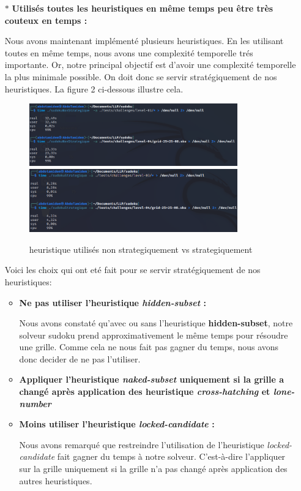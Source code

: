 \documentclass{article}
\begin{document}
\begin{enumerate}
\item[$\ast$] \textbf{Utilisés toutes les heuristiques en même temps peu être très couteux en temps : } \vspace{0.15cm}

Nous avons maintenant implémenté plusieurs heuristiques. En les utilisant toutes en même temps, nous avons une complexité temporelle trés importante. Or, notre principal objectif est d'avoir une complexité temporelle la plus minimale possible. On doit donc se servir stratégiquement de nos heuristiques. La figure 2 ci-dessous illustre cela. 

\begin{figure}[H]
\includegraphics[width=9cm,left]{sansStrategie.png}
\includegraphics[width=9cm,right]{strategique.png}
    \caption{heuristique utilisés non strategiquement vs strategiquement}
\end{figure}

Voici les choix qui ont eté fait pour se servir stratégiquement de nos heuristiques:\vspace{0.2cm}

\begin{itemize}
    \item \textbf{Ne pas utiliser l'heuristique \textit{hidden-subset} :}
    
    Nous avons constaté qu'avec ou sans l'heuristique \textbf{hidden-subset}, notre solveur sudoku prend approximativement le même temps pour résoudre une grille. Comme cela ne nous fait pas gagner du temps, nous avons donc decider de ne pas l'utiliser.\vspace{0.2cm}

    \item \textbf{Appliquer l'heuristique  \textit{naked-subset} uniquement si la grille a changé après application des heuristique \textit{cross-hatching} et \textit{lone-number} }\vspace{0.4cm}

    \item \textbf{Moins utiliser l'heuristique  \textit{locked-candidate} :}

    Nous avons remarqué que restreindre l'utilisation de l'heuristique  \textit{locked-candidate} fait gagner du temps à notre solveur.
    C'est-à-dire l'appliquer sur la grille uniquement si la grille n'a pas changé après application des autres heuristiques.
    
    
\end{itemize}

\end{enumerate}
\end{document}
